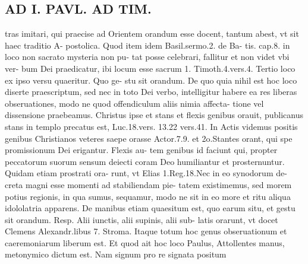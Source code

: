 \documentclass{article}
\begin{document}
\begin{pages}
\section*{AD I. PAVL. AD TIM. }
\marginpar{[ p.74 ]}\pstart tras imitari, qui praecise ad Orientem orandum esse docent, tantum abest, vt sit haec traditio A- postolica. Quod item idem Basil.sermo.2. de Ba- tis. cap.8. in loco non sacrato mysteria non pu- tat posse celebrari, fallitur et non videt vbi ver- bum Dei praedicatur, ibi locum esse sacrum 1. Timoth.4.vers.4. Tertio loco ex ipso versu quaeritur. Quo ge- stu sit orandum. De quo quia nihil est hoc loco diserte praescriptum, sed nec in toto Dei verbo, intelligitur habere ea res liberas obseruationes, modo ne quod offendiculum aliis nimia affecta- tione vel dissensione praebeamus. Christus ipse et stans et flexis genibus orauit, publicanus stans in templo precatus est, Luc.18.vers. 13.22 vers.41. In Actis videmus positis genibus Christianos veteres saepe orasse Actor.7.9. et 2o.Stantes orant, qui spe promissionum Dei erigantur. Flexis au- tem genibus id faciunt qui, propter peccatorum suorum sensum deiecti coram Deo humiliantur et prosternuntur. Quidam etiam prostrati ora- runt, vt Elias 1.Reg.18.Nec in eo synodorum de- creta magni esse momenti ad stabiliendam pie- tatem existimemus, sed morem potius regionis, in qua sumus, sequamur, modo ne sit in eo more et ritu aliqua idololatria apparens. De manibus etiam quaesitum est, quo earum situ, et gestu sit orandum. Resp. Alii iunctis, alii supinis, alii sub- latis orarunt, vt docet Clemens Alexandr.libus 7. Stroma. Itaque totum hoc genus obseruationum et caeremoniarum liberum est. Et quod ait hoc loco Paulus, Attollentes manus, metonymico dictum est. Nam signum pro re signata positum  \pend

\end{pages}
\end{document}
